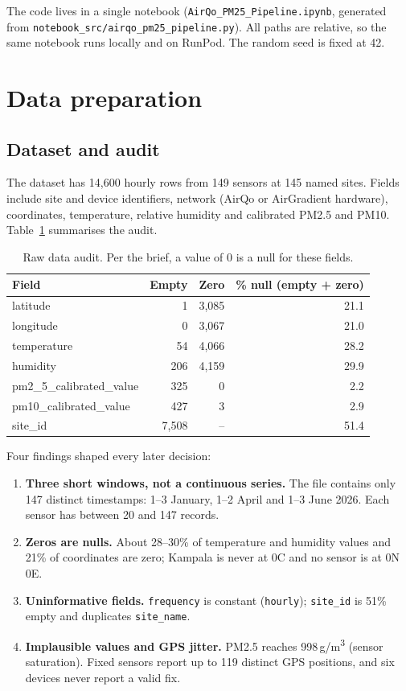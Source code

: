 \documentclass[11pt,a4paper]{article}
\newcommand{\ugm}{\,\textmu g/m\textsuperscript{3}}
\begin{document}
The code lives in a single notebook (\texttt{AirQo\_PM25\_Pipeline.ipynb}, generated from \texttt{notebook\_src/airqo\_pm25\_pipeline.py}). All paths are relative, so the same notebook runs locally and on RunPod. The random seed is fixed at 42.

\section{Data preparation}
\subsection{Dataset and audit}
The dataset has 14{,}600 hourly rows from 149 sensors at 145 named sites. Fields include site and device identifiers, network (AirQo or AirGradient hardware), coordinates, temperature, relative humidity and calibrated PM2.5 and PM10. Table~\ref{tab:audit} summarises the audit.

\begin{table}[H]
\centering\small
\caption{Raw data audit. Per the brief, a value of 0 is a null for these fields.}
\label{tab:audit}
\begin{tabular}{lrrr}
\toprule
Field & Empty & Zero & \% null (empty + zero) \\
\midrule
latitude & 1 & 3{,}085 & 21.1 \\
longitude & 0 & 3{,}067 & 21.0 \\
temperature & 54 & 4{,}066 & 28.2 \\
humidity & 206 & 4{,}159 & 29.9 \\
pm2\_5\_calibrated\_value & 325 & 0 & 2.2 \\
pm10\_calibrated\_value & 427 & 3 & 2.9 \\
site\_id & 7{,}508 & -- & 51.4 \\
\bottomrule
\end{tabular}
\end{table}

Four findings shaped every later decision:
\begin{enumerate}
\item \textbf{Three short windows, not a continuous series.} The file contains only 147 distinct timestamps: 1--3 January, 1--2 April and 1--3 June 2026. Each sensor has between 20 and 147 records.
\item \textbf{Zeros are nulls.} About 28--30\% of temperature and humidity values and 21\% of coordinates are zero; Kampala is never at 0\degree C and no sensor is at 0\degree N 0\degree E.
\item \textbf{Uninformative fields.} \texttt{frequency} is constant (\texttt{hourly}); \texttt{site\_id} is 51\% empty and duplicates \texttt{site\_name}.
\item \textbf{Implausible values and GPS jitter.} PM2.5 reaches 998\ugm{} (sensor saturation). Fixed sensors report up to 119 distinct GPS positions, and six devices never report a valid fix.
\end{enumerate}
\end{document}
